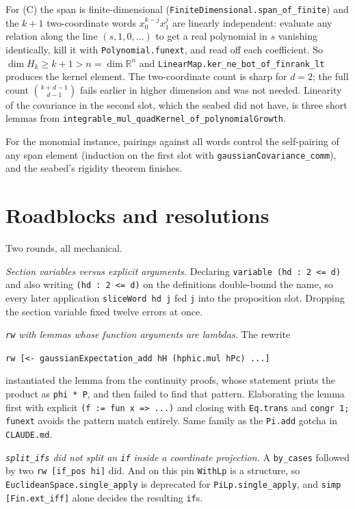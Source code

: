 \documentclass[11pt]{article}
\newcommand{\R}{\mathbb{R}}
\newcommand{\code}[1]{\texttt{#1}}
\begin{document}
For (C) the span is finite-dimensional
(\code{FiniteDimensional.span\_of\_finite}) and the $k + 1$ two-coordinate
words $x_0^{k-j} x_1^{j}$ are linearly independent: evaluate any
relation along the line $(s, 1, 0, \dots)$ to get a real polynomial in
$s$ vanishing identically, kill it with \code{Polynomial.funext}, and
read off each coefficient. So $\dim H_k \ge k + 1 > n = \dim \R^n$ and
\code{LinearMap.ker\_ne\_bot\_of\_finrank\_lt} produces the kernel
element. The two-coordinate count is sharp for $d = 2$; the full count
$\binom{k+d-1}{d-1}$ fails earlier in higher dimension and was not
needed. Linearity of the covariance in the second slot, which the
seabed did not have, is three short lemmas from
\code{integrable\_mul\_quadKernel\_of\_polynomialGrowth}.

For the monomial instance, pairings against all words control the
self-pairing of any span element (induction on the first slot with
\code{gaussianCovariance\_comm}), and the seabed's rigidity theorem
finishes.

\section{Roadblocks and resolutions}

Two rounds, all mechanical.

\emph{Section variables versus explicit arguments.} Declaring
\code{variable (hd : 2 <= d)} and also writing \code{(hd : 2 <= d)} on
the definitions double-bound the name, so every later application
\code{sliceWord hd j} fed \code{j} into the proposition slot. Dropping
the section variable fixed twelve errors at once.

\emph{\code{rw} with lemmas whose function arguments are lambdas.} The
rewrite
\begin{center}\code{rw [<- gaussianExpectation\_add hH (hphic.mul hPc) ...]}\end{center}
instantiated the lemma from the continuity proofs, whose statement
prints the product as \code{phi * P}, and then failed to find that
pattern. Elaborating the lemma first with explicit \code{(f := fun x =>
...)} and closing with \code{Eq.trans} and \code{congr 1; funext} avoids
the pattern match entirely. Same family as the \code{Pi.add} gotcha in
\code{CLAUDE.md}.

\emph{\code{split\_ifs} did not split an \code{if} inside a coordinate
projection.} A \code{by\_cases} followed by two \code{rw [if\_pos hi]}
did. And on this pin \code{WithLp} is a structure, so
\code{EuclideanSpace.single\_apply} is deprecated for
\code{PiLp.single\_apply}, and \code{simp [Fin.ext\_iff]} alone decides
the resulting \code{if}s.
\end{document}
